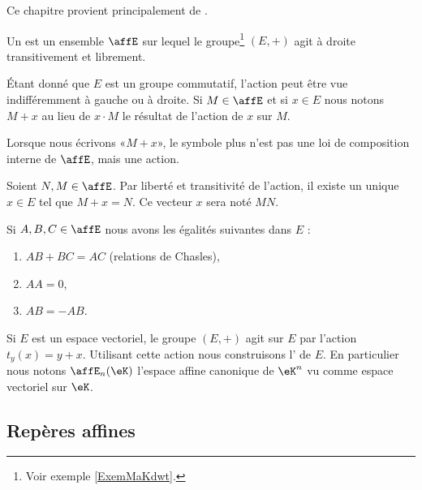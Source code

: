 Ce chapitre provient principalement de \cite{Combes}.


\begin{definition}
    Un  est un ensemble \( \affE\) sur lequel le groupe\footnote{Voir exemple \ref{ExemMaKdwt}.} \( (E,+)\) agit à droite transitivement et librement.
\end{definition}

Étant donné que \( E\) est un groupe commutatif, l'action peut être vue indifféremment à gauche ou à droite. Si \( M\in\affE\) et si \( x\in E\) nous notons \( M+x\) au lieu de \( x\cdot M\) le résultat de l'action de \( x\) sur \( M\).

\begin{remark}
    Lorsque nous écrivons «\( M+x\)», le symbole plus n'est pas une loi de composition interne de \( \affE\), mais une action.
\end{remark}

Soient \( N,M\in\affE\). Par liberté et transitivité de l'action, il existe un unique \( x\in E\) tel que \( M+x=N\). Ce vecteur \( x\) sera noté \( MN\).

\begin{proposition}
    Si \( A,B,C\in\affE\) nous avons les égalités suivantes dans \( E\) :
    \begin{enumerate}
        \item
            \( AB+BC=AC\) (relations de Chasles),
        \item
            \( AA=0\),
        \item
            \( AB=-AB\).
    \end{enumerate}
\end{proposition}

Si \( E\) est un espace vectoriel, le groupe \( (E,+)\) agit sur \( E\) par l'action \( t_y(x)=y+x\). Utilisant cette action nous construisons l' de \( E\). En particulier nous notons \( \affE_n(\eK)\) l'espace affine canonique de \( \eK^n\) vu comme espace vectoriel sur \( \eK\).

\subsection{Repères affines}

